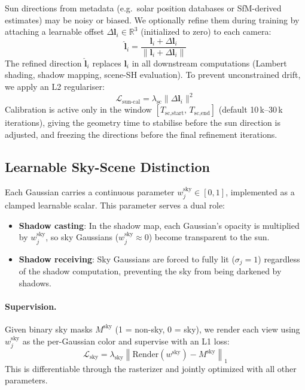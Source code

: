 \documentclass[conference]{IEEEtran}
\begin{document}
Sun directions from metadata (e.g.\ solar position databases or SfM-derived estimates) may be noisy or biased.
We optionally refine them during training by attaching a learnable offset $\Delta\mathbf{l}_i \in \mathbb{R}^3$ (initialized to zero) to each camera:
\begin{equation}
    \hat{\mathbf{l}}_i = \frac{\mathbf{l}_i + \Delta\mathbf{l}_i}{\|\mathbf{l}_i + \Delta\mathbf{l}_i\|}
    \label{eq:sun_cal}
\end{equation}
The refined direction $\hat{\mathbf{l}}_i$ replaces $\mathbf{l}_i$ in all downstream computations (Lambert shading, shadow mapping, scene-SH evaluation).
To prevent unconstrained drift, we apply an L2 regulariser:
\begin{equation}
    \mathcal{L}_{\text{sun-cal}} = \lambda_{\text{sc}} \|\Delta\mathbf{l}_i\|^2
    \label{eq:sun_cal_reg}
\end{equation}
Calibration is active only in the window $[T_{\text{sc,start}},\, T_{\text{sc,end}}]$ (default 10\,k--30\,k iterations), giving the geometry time to stabilise before the sun direction is adjusted, and freezing the directions before the final refinement iterations.

\subsection{Learnable Sky-Scene Distinction}
\label{sec:sky_mask}

Each Gaussian carries a continuous parameter $w_j^{\text{sky}} \in [0, 1]$, implemented as a clamped learnable scalar.
This parameter serves a dual role:
\begin{itemize}
    \item \textbf{Shadow casting}: In the shadow map, each Gaussian's opacity is multiplied by $w_j^{\text{sky}}$, so sky Gaussians ($w_j^{\text{sky}} \approx 0$) become transparent to the sun.
    \item \textbf{Shadow receiving}: Sky Gaussians are forced to fully lit ($\sigma_j = 1$) regardless of the shadow computation, preventing the sky from being darkened by shadows.
\end{itemize}

\paragraph{Supervision.}
Given binary sky masks $M^{\text{sky}}$ (1 = non-sky, 0 = sky), we render each view using $w_j^{\text{sky}}$ as the per-Gaussian color and supervise with an L1 loss:
\begin{equation}
    \mathcal{L}_{\text{sky}} = \lambda_{\text{sky}} \left\| \text{Render}(w^{\text{sky}}) - M^{\text{sky}} \right\|_1
    \label{eq:sky_loss}
\end{equation}
This is differentiable through the rasterizer and jointly optimized with all other parameters.
\end{document}
